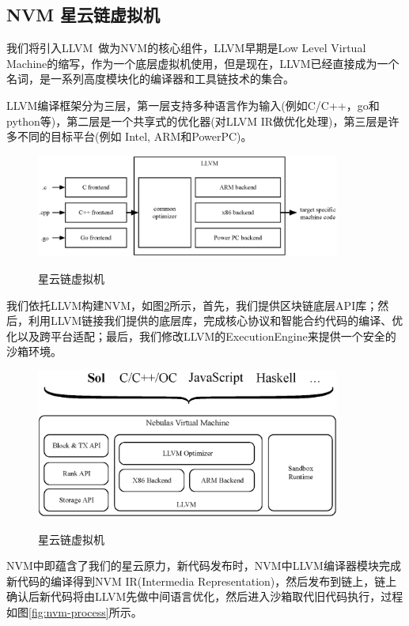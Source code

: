 \subsection{NVM 星云链虚拟机}
\label{sec:nvm}

我们将引入LLVM~\cite{llvm}做为NVM的核心组件，LLVM早期是Low Level Virtual Machine的缩写，作为一个底层虚拟机使用，但是现在，LLVM已经直接成为一个名词，是一系列高度模块化的编译器和工具链技术的集合。

LLVM编译框架分为三层，第一层支持多种语言作为输入(例如C/C++，go和python等)，第二层是一个共享式的优化器(对LLVM IR做优化处理)，第三层是许多不同的目标平台(例如 Intel, ARM和PowerPC)。

\begin{figure}[h]
\centering
\includegraphics[width=10cm]{./figs/llvm}
\label{fig:llvm}
\caption{星云链虚拟机}
\end{figure}

我们依托LLVM构建NVM，如图\ref{fig:nvm}所示，首先，我们提供区块链底层API库；然后，利用LLVM链接我们提供的底层库，完成核心协议和智能合约代码的编译、优化以及跨平台适配；最后，我们修改LLVM的ExecutionEngine来提供一个安全的沙箱环境。

\begin{figure}[h]
\centering
\includegraphics[width=10cm]{./figs/nvm}
\label{fig:nvm}
\caption{星云链虚拟机}
\end{figure}

NVM中即蕴含了我们的星云原力，新代码发布时，NVM中LLVM编译器模块完成新代码的编译得到NVM IR(Intermedia Representation)，然后发布到链上，链上确认后新代码将由LLVM先做中间语言优化，然后进入沙箱取代旧代码执行，过程如图\ref{fig:nvm-process}所示。 \\

